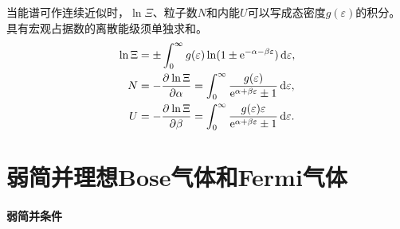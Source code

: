 \begin{corollary}
	当能谱可作连续近似时，$\ln\Xi$、粒子数$N$和内能$U$可以写成态密度$g(\varepsilon)$的积分。具有宏观占据数的离散能级须单独求和。
	\begin{subequations}
		\begin{align}
			\ln\Xi &= \pm\int_0^\infty g(\varepsilon)\ln(1 \pm \mathop{}\!\mathrm{e}^{-\alpha-\beta\varepsilon})\mathop{}\!\mathrm{d}\varepsilon,\\
			N &= -\frac{\partial^{}\ln\Xi}{\partial{\alpha}^{}} = \int_0^\infty\frac{g(\varepsilon)}{\mathop{}\!\mathrm{e}^{\alpha+\beta\varepsilon} \pm 1}\mathop{}\!\mathrm{d}\varepsilon,\\
			U &= -\frac{\partial^{}\ln\Xi}{\partial{\beta}^{}} = \int_0^\infty\frac{g(\varepsilon)\varepsilon}{\mathop{}\!\mathrm{e}^{\alpha+\beta\varepsilon} \pm 1}\mathop{}\!\mathrm{d}\varepsilon.
		\end{align}
	\end{subequations}
\end{corollary}

\section{弱简并理想Bose气体和Fermi气体}
\label{sec:weak degeneracy}

\paragraph{弱简并条件}

